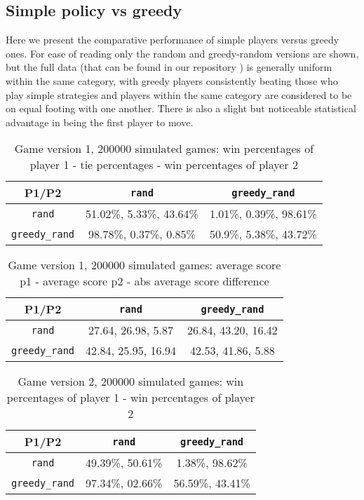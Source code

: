 \documentclass[conference]{IEEEtran}
\begin{document}
\subsection{Simple policy vs greedy}
Here we present the comparative performance of simple players versus greedy ones. For ease of reading only the random and greedy-random versions are shown, but the full data (that can be found in our repository \cite{repository}) is generally uniform within the same category, with greedy players consistently beating those who play simple strategies and players within the same category are considered to be on equal footing with one another. There is also a slight but noticeable statistical advantage in being the first player to move.
\begin{table}[hbt!]
\begin{center}
\begin{tabular}{|c||c|c|}
    \hline
    P1/P2 &  \verb|rand| & \verb|greedy_rand|\\
    \hline \hline
    \verb|rand| & 51.02\%, 5.33\%, 43.64\% & 1.01\%, 0.39\%, 98.61\%\\
    \hline
    \verb|greedy_rand| & 98.78\%, 0.37\%,  0.85\%  & 50.9\%, 5.38\%, 43.72\%\\
    \hline
\end{tabular}
\caption{Game version 1, 200000 simulated games: win percentages of player 1 - tie percentages - win percentages of player 2}
\end{center}
\end{table}

\begin{table}[hbt!]
\begin{center}
\begin{tabular}{|c||c|c|}
    \hline
    P1/P2 &  \verb|rand| & \verb|greedy_rand|\\
    \hline \hline
    \verb|rand| & 27.64, 26.98, 5.87 & 26.84, 43.20, 16.42\\
    \hline
    \verb|greedy_rand| & 42.84, 25.95, 16.94 & 42.53, 41.86, 5.88 \\
    \hline
\end{tabular}
\caption{Game version 1, 200000 simulated games: average score p1 - average score p2 - abs average score difference}
\end{center}
\end{table}



\begin{table}[hbt!]
\begin{center}
\begin{tabular}{|c||c|c|}
    \hline
    P1/P2 &  \verb|rand| & \verb|greedy_rand|\\
    \hline \hline
    \verb|rand| & 49.39\%, 50.61\%  & 1.38\%, 98.62\%\\
    \hline
    \verb|greedy_rand| & 97.34\%, 02.66\% & 56.59\%, 43.41\%\\
    \hline
\end{tabular}
\caption{Game version 2, 200000 simulated games: win percentages of player 1 - win percentages of player 2}
\end{center}
\end{table}
\end{document}

